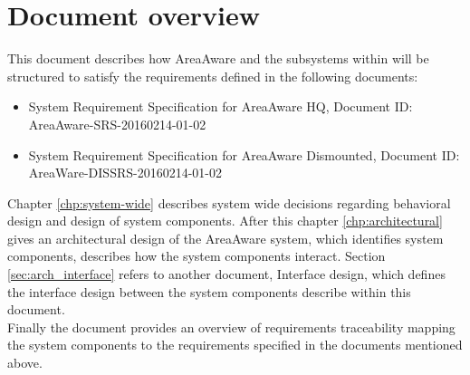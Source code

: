 \section{Document overview}
This document describes how AreaAware and the subsystems within will be structured to satisfy the requirements defined in the following documents:
\begin{itemize}
    \item System Requirement Specification for AreaAware HQ, Document ID: AreaAware-SRS-20160214-01-02
    \item System Requirement Specification for AreaAware Dismounted, Document ID: AreaWare-DISSRS-20160214-01-02
\end{itemize}

Chapter \ref{chp:system-wide} describes system wide decisions regarding behavioral design and design of system components.
After this chapter \ref{chp:architectural} gives an architectural design of the AreaAware system, which identifies system components, describes how the system components interact.
Section \ref{sec:arch_interface} refers to another document, Interface design, which defines the interface design between the system components describe within this document. \\
Finally the document provides an overview of requirements traceability mapping the system components to the requirements specified in the documents mentioned above.